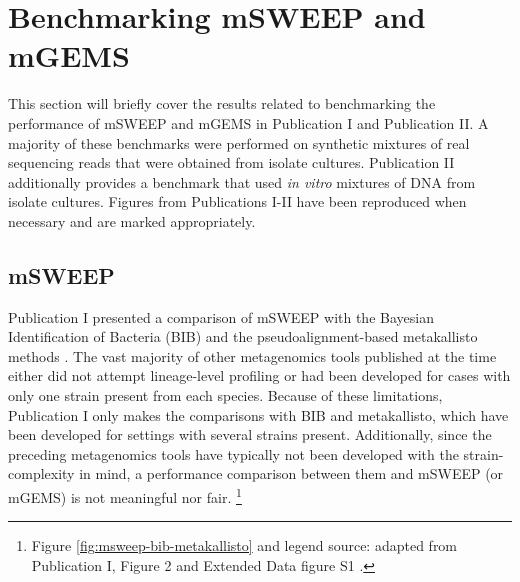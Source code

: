 \documentclass[officiallayout]{tktla}
\let\svthefootnote\thefootnote
\begin{document}
\section{Benchmarking mSWEEP and mGEMS}

This section will briefly cover the results related to benchmarking
the performance of mSWEEP and mGEMS in Publication I and Publication
II. A majority of these benchmarks were performed on synthetic
mixtures of real sequencing reads that were obtained from isolate
cultures. Publication II additionally provides a benchmark that used
\textit{in vitro} mixtures of DNA from isolate cultures. Figures from
Publications I-II have been reproduced when necessary and are marked
appropriately.

\subsection{mSWEEP}
Publication I presented a comparison of mSWEEP with the Bayesian
Identification of Bacteria (BIB) \citep{sankar2016bayesian} and the
pseudoalignment-based metakallisto methods
\citep{schaeffer2017pseudoalignment}. The vast majority of other
metagenomics tools published at the time either did not attempt
lineage-level profiling or had been developed for cases with only one
strain present from each species. Because of these limitations,
Publication I only makes the comparisons with BIB and metakallisto,
which have been developed for settings with several strains
present. Additionally, since the preceding metagenomics tools have
typically not been developed with the strain-complexity in mind, a
performance comparison between them and mSWEEP (or mGEMS) is not
meaningful nor fair.
\noindent\let\thefootnote\relax\footnote{Figure \ref{fig:msweep-bib-metakallisto} and legend source: adapted from Publication I, Figure 2 and Extended Data figure S1 \citep{maklin_high-resolution_2021}.}
\addtocounter{footnote}{-1}\let\thefootnote\svthefootnote
\end{document}
